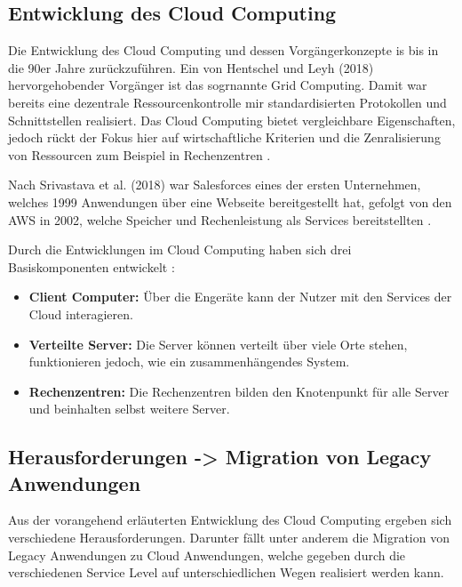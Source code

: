 \subsection{Entwicklung des Cloud Computing}

Die Entwicklung des Cloud Computing und dessen Vorgängerkonzepte is bis in die 90er Jahre zurückzuführen.
Ein von Hentschel und Leyh (2018) hervorgehobender Vorgänger ist das sogrnannte Grid Computing.
Damit war bereits eine dezentrale Ressourcenkontrolle mir standardisierten Protokollen und
Schnittstellen realisiert. Das Cloud Computing bietet vergleichbare Eigenschaften, jedoch rückt der
Fokus hier auf wirtschaftliche Kriterien und die Zenralisierung von Ressourcen zum Beispiel in
Rechenzentren \cite[Vgl.][S. 5f]{Reinheimer2018}.

Nach Srivastava et al. (2018) war Salesforces eines der ersten Unternehmen, welches 1999 Anwendungen über eine Webseite bereitgestellt hat,
gefolgt von den \acf{AWS} in 2002, welche Speicher und Rechenleistung als Services bereitstellten \cite[Vgl.][S. 17f]{Srivastava2018}.

Durch die Entwicklungen im Cloud Computing haben sich drei Basiskomponenten entwickelt \cite[Vgl.][S. 18]{Srivastava2018}:
\begin{itemize}
\item \textbf{Client Computer: }Über die Engeräte kann der Nutzer mit den Services der Cloud interagieren.
\item \textbf{Verteilte Server: }Die Server können verteilt über viele Orte stehen, funktionieren jedoch, wie ein zusammenhängendes System.
\item \textbf{Rechenzentren: }Die Rechenzentren bilden den Knotenpunkt für alle Server und beinhalten selbst weitere Server.
\end{itemize}

\pagebreak

\subsection{Herausforderungen -> Migration von Legacy Anwendungen}

Aus der vorangehend erläuterten Entwicklung des Cloud Computing ergeben sich verschiedene Herausforderungen.
Darunter fällt unter anderem die Migration von Legacy Anwendungen zu Cloud Anwendungen, welche gegeben durch die verschiedenen Service Level
auf unterschiedlichen Wegen realisiert werden kann.